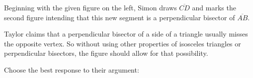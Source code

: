 \documentclass[nooutcomes]{ximera}
\begin{document}
\begin{problem}
Beginning with the given figure on the left, Simon draws $\overline{CD}$ and marks the second figure intending that this new segment is a perpendicular bisector of $\overline{AB}$.

Taylor claims that a perpendicular bisector of a side of a triangle usually misses the opposite vertex.  So without using other properties of isosceles triangles or perpendicular bisectors, the figure should allow for that possibility.  


Choose the best response to their argument: 
\begin{multipleChoice}
\end{multipleChoice} 
\end{problem}
\end{document}
